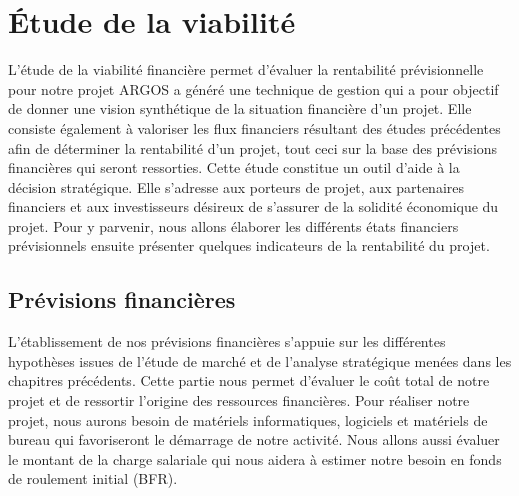 \renewcommand{\rowcolor}[1]{\cellcolor{#1}}

\chapter{Étude de la viabilité}
\label{chap:viabilite_financière}

L’étude de la viabilité financière permet d’évaluer la rentabilité prévisionnelle pour notre projet ARGOS a généré une technique de gestion qui a pour objectif de donner une vision synthétique de la situation financière d’un projet. Elle consiste également à valoriser les flux financiers résultant des études précédentes afin de déterminer la rentabilité d’un projet, tout ceci sur la base des prévisions financières qui seront ressorties. Cette étude constitue un outil d’aide à la décision stratégique. Elle s’adresse aux porteurs de projet, aux partenaires financiers et aux investisseurs désireux de s’assurer de la solidité économique du projet. Pour y parvenir, nous allons élaborer les différents états financiers prévisionnels ensuite présenter quelques indicateurs de la rentabilité du projet.

\section{Prévisions financières}
L’établissement de nos prévisions financières s’appuie sur les différentes hypothèses issues de l’étude de marché et de l’analyse stratégique menées dans les chapitres précédents. Cette partie nous permet d’évaluer le coût total de notre projet et de ressortir l’origine des ressources financières. Pour réaliser notre projet, nous aurons besoin de matériels informatiques, logiciels et matériels de bureau qui favoriseront le démarrage de notre activité. Nous allons aussi évaluer le montant de la charge salariale qui nous aidera à estimer notre besoin en fonds de roulement initial (BFR).

